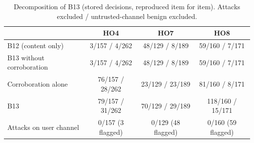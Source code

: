 \begin{table}[t]\centering\caption{Decomposition of B13 (stored decisions, reproduced item for item). Attacks excluded / untrusted-channel benign excluded.}\label{tab:decomp}
\footnotesize\begin{tabular}{lccc}\toprule & HO4 & HO7 & HO8\\\midrule
B12 (content only) & 3/157 / 4/262 & 48/129 / 8/189 & 59/160 / 7/171\\
B13 without corroboration & 3/157 / 4/262 & 48/129 / 8/189 & 59/160 / 7/171\\
Corroboration alone & 76/157 / 28/262 & 23/129 / 23/189 & 81/160 / 8/171\\
B13 & 79/157 / 31/262 & 70/129 / 29/189 & 118/160 / 15/171\\
\midrule Attacks on user channel & 0/157 (3 flagged) & 0/129 (48 flagged) & 0/160 (59 flagged)\\
\bottomrule\end{tabular}\end{table}
